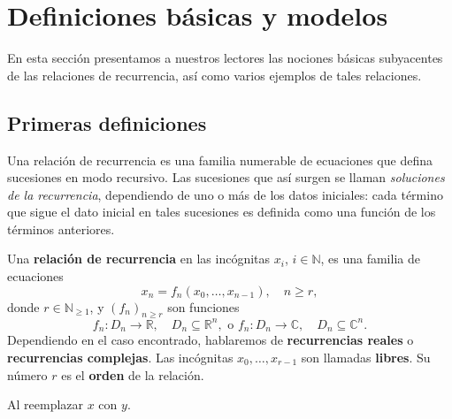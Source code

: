 \documentclass{amsart}
\begin{document}
\section{Definiciones básicas y modelos}
En esta sección presentamos a nuestros lectores las nociones básicas subyacentes de las relaciones de recurrencia, así como varios ejemplos de tales relaciones.
\subsection{Primeras definiciones}
Una relación de recurrencia es una familia numerable de ecuaciones que defina sucesiones en modo recursivo. Las sucesiones que así surgen se llaman \emph{soluciones de la recurrencia}, dependiendo de uno o más de los datos iniciales: cada término que sigue el dato inicial en tales sucesiones es definida como una función de los términos anteriores.

\begin{definition}
	Una \textbf{relación de recurrencia} en las incógnitas $x_{i}$, $i\in\mathbb{N}$, es una familia de ecuaciones \[ x_{n}=f_{n}\left(x_{0},\ldots,x_{n-1}\right),\quad n\geq r, \] donde $r\in\mathbb{N}_{\geq1}$, y ${\left(f_{n}\right)}_{n\geq r}$ son funciones \[ f_{n}\colon D_{n}\rightarrow\mathbb{R},\quad D_{n}\subseteq\mathbb{R}^{n},\text{ o }f_{n}\colon D_{n}\rightarrow\mathbb{C},\quad D_{n}\subseteq\mathbb{C}^{n}. \] Dependiendo en el caso encontrado, hablaremos de \textbf{recurrencias reales} o \textbf{recurrencias complejas}. Las incógnitas $x_{0},\ldots,x_{r-1}$ son llamadas \textbf{libres}. Su número $r$ es el \textbf{orden} de la relación.
	
	Al reemplazar $x$ con $y$.
\end{definition}
\end{document}
